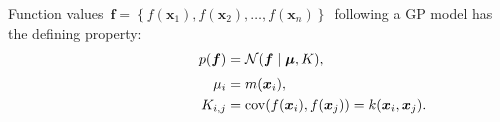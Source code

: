 \documentclass[landscape,a1,final]{a0poster} %
\let\tempone\itemize
\let\temptwo\enditemize
\renewenvironment{itemize}{\tempone\addtolength{\itemsep}{-0.3\baselineskip}}{\temptwo}
\def\figpdfdir{fig/} %
\DeclareMathOperator{\cov}{cov}
\begin{document}
\begin{minipage}{1\linewidth}
\begin{minipage}[t]{0.31\linewidth}
\begin{itemize}
\item Function values\, $\bm{f}=\left\lbrace  f(\bm{x}_1), f(\bm{x}_2), \hdots, f(\bm{x}_n) \right\rbrace$\, following a GP model has the defining property:
%
\begin{align*}
p(\bm{f}) &= \mathcal{N}(\bm{f} \mid \bm{\mu}, K),\\[1mm]
\mu_i &= m(\bm{x}_i),\\
\hspace{27mm} K_{i,j} &=\cov( f(\bm{x}_i),f(\bm{x}_j))=k(\bm{x}_i,\bm{x}_j).
\end{align*}


%
%



%
%
 


\end{itemize}
\end{minipage}
\end{minipage}
\end{document}
